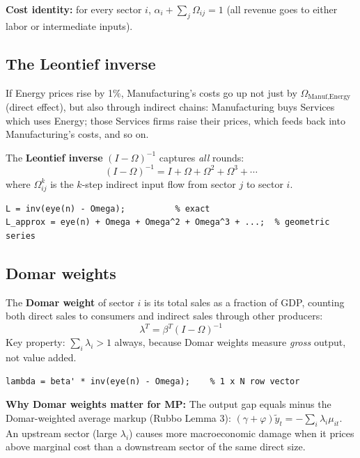 \documentclass[11pt]{article}
\begin{document}
\begin{keybox}
\textbf{Cost identity:} for every sector $i$,
$\alpha_i + \sum_j \Omega_{ij} = 1$
(all revenue goes to either labor or intermediate inputs).
\end{keybox}

\subsection{The Leontief inverse}

If Energy prices rise by 1\%, Manufacturing's costs go up not just by
$\Omega_{\text{Manuf,Energy}}$ (direct effect), but also through indirect chains:
Manufacturing buys Services which uses Energy; those Services firms raise their
prices, which feeds back into Manufacturing's costs, and so on.

The \textbf{Leontief inverse} $(I-\Omega)^{-1}$ captures \emph{all} rounds:
\[
  (I-\Omega)^{-1} = I + \Omega + \Omega^2 + \Omega^3 + \cdots
\]
where $\Omega^k_{ij}$ is the $k$-step indirect input flow from sector $j$ to sector $i$.

\begin{lstlisting}[caption={Matlab: Leontief inverse}]
L = inv(eye(n) - Omega);          % exact
L_approx = eye(n) + Omega + Omega^2 + Omega^3 + ...;  % geometric series
\end{lstlisting}

\subsection{Domar weights}

The \textbf{Domar weight} of sector $i$ is its total sales as a fraction of GDP,
counting both direct sales to consumers and indirect sales through other producers:
\[
  \lambda^T = \beta^T(I-\Omega)^{-1}
\]
Key property: $\sum_i \lambda_i > 1$ always, because Domar weights measure
\emph{gross} output, not value added.

\begin{lstlisting}[caption={Matlab: Domar weights}]
lambda = beta' * inv(eye(n) - Omega);    % 1 x N row vector
\end{lstlisting}

\begin{insight}
\textbf{Why Domar weights matter for MP:}
The output gap equals minus the Domar-weighted average markup (Rubbo Lemma 3):
$(\gamma+\varphi)\tilde{y}_t = -\sum_i \lambda_i \mu_{it}$.
An upstream sector (large $\lambda_i$) causes more macroeconomic damage when it
prices above marginal cost than a downstream sector of the same direct size.
\end{insight}
\end{document}
